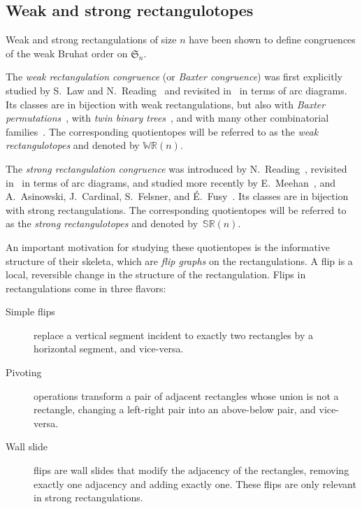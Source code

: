\documentclass{amsart}
\theoremstyle{definition}
\newcommand{\f}[1]{\mathfrak{#1}} %
\newcommand{\darkblue}{\color{darkblue}} %
\newcommand{\defn}[1]{\textsl{\darkblue #1}} %
\newcommand{\polytope}[1]{\mathds{#1}} %
\newcommand{\WRP}{\polytope{WR}} %
\newcommand{\SRP}{\polytope{SR}} %
\begin{document}
\subsection{Weak and strong rectangulotopes}

Weak and strong rectangulations of size $n$ have been shown to define congruences of the weak Bruhat order on $\f{S}_n$.

The \defn{weak rectangulation congruence} (or \defn{Baxter congruence}) was first explicitly studied by S.~Law and N.~Reading~\cite{MR2871762} and revisited in~\cite[Thm.~1.1 \& Exm.~4.10]{Reading-arcDiagrams} in terms of arc diagrams.
Its classes are in bijection with weak rectangulations, but also with \defn{Baxter permutations}~\cite{MR0491652,MR0555815}, with \defn{twin binary trees}~\cite{MR1417289,MR2914637}, and with many other combinatorial families~\cite{MR2763051}. 
The corresponding quotientopes will be referred to as the \defn{weak rectangulotopes} and denoted by $\WRP(n)$.

The \defn{strong rectangulation congruence} was introduced by N.~Reading~\cite{MR2864445}, revisited in~\cite[Thm.~1.2 \& Exm.~4.11]{Reading-arcDiagrams} in terms of arc diagrams, and studied more recently by E.~Meehan~\cite{MR3697823}, and A.~Asinowski, J.~Cardinal, S.~Felsner, and É.~Fusy~\cite{ACFF24}.
Its classes are in bijection with strong rectangulations.
The corresponding quotientopes will be referred to as the \defn{strong rectangulotopes} and denoted by~$\SRP(n)$.

An important motivation for studying these quotientopes is the informative structure of their skeleta, which are \defn{flip graphs} on the rectangulations.
A flip is a local, reversible change in the structure of the rectangulation.
Flips in rectangulations come in three flavors:
\begin{description}
\item[Simple flips] replace a vertical segment incident to exactly two rectangles by a horizontal segment, and vice-versa.
\item[Pivoting] operations transform a pair of adjacent rectangles whose union is not a rectangle, changing a left-right pair into an above-below pair, and vice-versa.
\item[Wall slide] flips are wall slides that modify the adjacency of the rectangles, removing exactly one adjacency and adding exactly one. These flips are only relevant in strong rectangulations.
\end{description}
\end{document}
